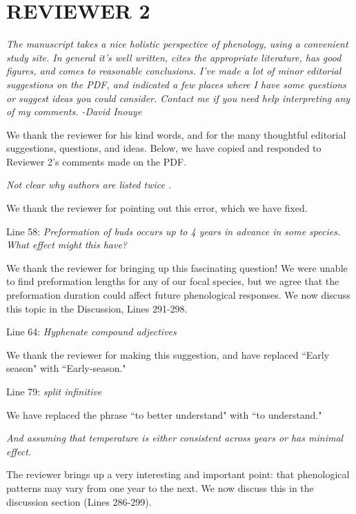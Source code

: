 \documentclass[10.95pt,a4paper]{letter}
\begin{document}
\section {REVIEWER 2}

\par \emph{The manuscript takes a nice holistic perspective of phenology, using a convenient study site. In general it's well written, cites the appropriate literature, has good figures, and comes to reasonable conclusions. I've made a lot of minor editorial suggestions on the PDF, and indicated a few places where I have some questions or suggest ideas you could consider. Contact me if you need help interpreting any of my comments. 
-David Inouye}
\par We thank the reviewer for his kind words, and for the many thoughtful editorial suggestions, questions, and ideas. Below, we have copied and responded to Reviewer 2's comments made on the PDF.

\par \emph{Not clear why authors are listed twice .}
\par We thank the reviewer for pointing out this error, which we have fixed. 

\par Line 58: \emph{Preformation of buds occurs up to 4 years in advance in some species.  What effect might this have?}
\par We thank the reviewer for bringing up this fascinating question! We were unable to find preformation lengths for any of our focal species, but we agree that the preformation duration could affect future phenological responses. We now discuss this topic in the Discussion, Lines 291-298.

\par Line 64: \emph{Hyphenate compound adjectives}
\par We thank the reviewer for making this suggestion, and have replaced ``Early season" with ``Early-season."
 
\par Line 79: \emph{split infinitive}
\par We have replaced the phrase ``to better understand" with ``to understand."
 
\par \emph{And assuming that temperature is either consistent across years or has minimal effect.}
\par The reviewer brings up a very interesting and important point: that phenological patterns may vary from one year to the next. We now discuss this in the discussion section (Lines 286-299). 
\end{document}
